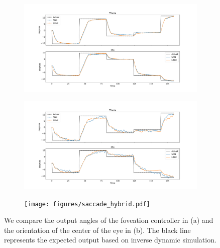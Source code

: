 \documentclass[../taasin.tex]{subfiles}
\begin{document}
\begin{figure}
    \centering

    \begin{subfigure}[b]{0.5\textwidth}
        \centering
        \includegraphics[width=\textwidth]{figures/saccade_normal.pdf}
        \caption{}
        \label{fig:saccade_normal}
    \end{subfigure}

    \hfill

    \begin{subfigure}[b]{0.5\textwidth}
        \centering
        \includegraphics[width=\textwidth]{figures/saccade_delta.pdf}
        \caption{}
        \label{fig:saccade_delta}
    \end{subfigure}

    \hfill

    \begin{subfigure}[b]{0.5\textwidth}
        \centering
        \texttt{[image: figures/saccade\_hybrid.pdf]}
        \caption{}
        \label{fig:saccade_hybrid}
    \end{subfigure}

    \caption{We compare the output angles of the foveation controller in (a) and the orientation of the center of the eye in (b). The black line represents the expected output based on inverse dynamic simulation.}
    \label{fig:saccade}
\end{figure}
\end{document}
